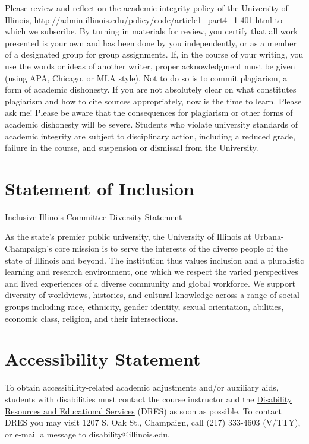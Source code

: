 \documentclass[]{article}
\begin{document}
Please review and reflect on the academic integrity policy of the
University of Illinois,
\url{http://admin.illinois.edu/policy/code/article1_part4_1-401.html} to
which we subscribe. By turning in materials for review, you certify that
all work presented is your own and has been done by you independently,
or as a member of a designated group for group assignments. If, in the
course of your writing, you use the words or ideas of another writer,
proper acknowledgment must be given (using APA, Chicago, or MLA style).
Not to do so is to commit plagiarism, a form of academic dishonesty. If
you are not absolutely clear on what constitutes plagiarism and how to
cite sources appropriately, now is the time to learn. Please ask me!
Please be aware that the consequences for plagiarism or other forms of
academic dishonesty will be severe. Students who violate university
standards of academic integrity are subject to disciplinary action,
including a reduced grade, failure in the course, and suspension or
dismissal from the University.

\section{Statement of Inclusion}\label{statement-of-inclusion}

\href{http://www.inclusiveillinois.illinois.edu/supporting_docs/Inclusive\%20Illinois\%20Diversity\%20Statement.pdf}{Inclusive
Illinois Committee Diversity Statement}

As the state's premier public university, the University of Illinois at
Urbana-Champaign's core mission is to serve the interests of the diverse
people of the state of Illinois and beyond. The institution thus values
inclusion and a pluralistic learning and research environment, one which
we respect the varied perspectives and lived experiences of a diverse
community and global workforce. We support diversity of worldviews,
histories, and cultural knowledge across a range of social groups
including race, ethnicity, gender identity, sexual orientation,
abilities, economic class, religion, and their intersections.

\section{Accessibility Statement}\label{accessibility-statement}

To obtain accessibility-related academic adjustments and/or auxiliary
aids, students with disabilities must contact the course instructor and
the \href{http://disability.illinois.edu/}{Disability Resources and
Educational Services} (DRES) as soon as possible. To contact DRES you
may visit 1207 S. Oak St., Champaign, call (217) 333-4603 (V/TTY), or
e-mail a message to disability@illinois.edu.
\end{document}

